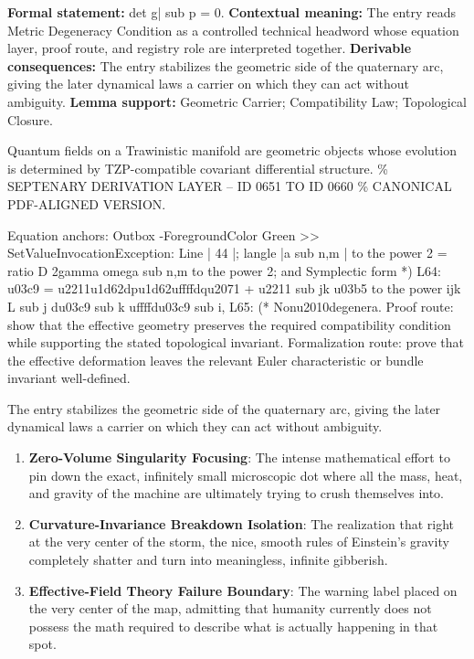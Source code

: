 \begingroup\footnotesize\setlength{\emergencystretch}{3em}\sloppy
\textbf{Formal statement:} det g| sub p = 0. \textbf{Contextual meaning:} The entry reads Metric Degeneracy Condition as a controlled technical headword whose equation layer, proof route, and registry role are interpreted together. \textbf{Derivable consequences:} The entry stabilizes the geometric side of the quaternary arc, giving the later dynamical laws a carrier on which they can act without ambiguity. \textbf{Lemma support:} Geometric Carrier; Compatibility Law; Topological Closure.\par
\endgroup

Quantum fields on a Trawinistic manifold are geometric objects whose evolution is determined by TZP-compatible covariant differential structure. \% SEPTENARY DERIVATION LAYER -- ID 0651 TO ID 0660 \% CANONICAL PDF-ALIGNED VERSION.

Equation anchors: Outbox -ForegroundColor Green >> SetValueInvocationException: Line | 44 |; langle |a sub n,m | to the power 2 = ratio D 2gamma omega sub n,m to the power 2; and Symplectic form *) L64: u03c9 = u2211u1d62dpu1d62uffffdqu2071 + u2211 sub jk u03b5 to the power ijk L sub j du03c9 sub k uffffdu03c9 sub i, L65: (* Nonu2010degenera. Proof route: show that the effective geometry preserves the required compatibility condition while supporting the stated topological invariant. Formalization route: prove that the effective deformation leaves the relevant Euler characteristic or bundle invariant well-defined.

The entry stabilizes the geometric side of the quaternary arc, giving the later dynamical laws a carrier on which they can act without ambiguity.
\endgroup

\begin{enumerate}[leftmargin=1.6em,itemsep=6pt,topsep=4pt]
\item \textbf{Zero-Volume Singularity Focusing}: The intense mathematical effort to pin down the exact, infinitely small microscopic dot where all the mass, heat, and gravity of the machine are ultimately trying to crush themselves into.
\item \textbf{Curvature-Invariance Breakdown Isolation}: The realization that right at the very center of the storm, the nice, smooth rules of Einstein's gravity completely shatter and turn into meaningless, infinite gibberish.
\item \textbf{Effective-Field Theory Failure Boundary}: The warning label placed on the very center of the map, admitting that humanity currently does not possess the math required to describe what is actually happening in that spot.
\end{enumerate}

